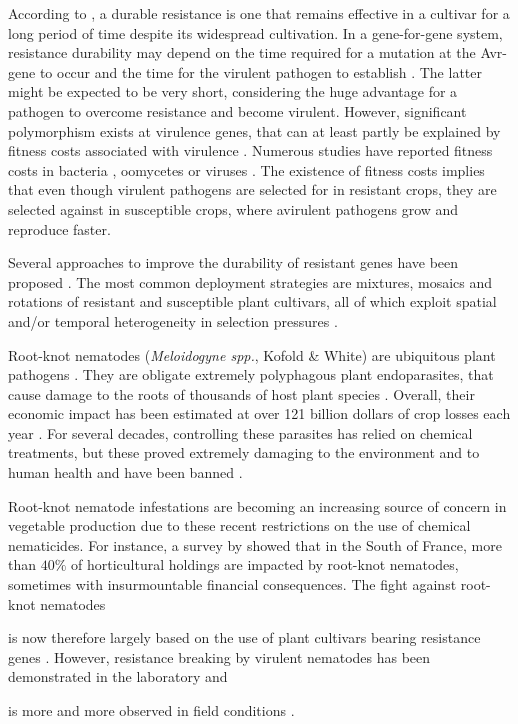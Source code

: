 {According to \citet{Johnson1981}, a durable resistance is one that
remains effective in a cultivar for a long period of time despite its
widespread cultivation. In a gene-for-gene system,
resistance durability may depend on the time required for a mutation
at the Avr-gene to occur and the time for the virulent pathogen to
establish
\citep{vandenBosch2003,Stuthman2007,Barrett2008,Fabre2009,Brown2015,Zhan2015}.
The latter might be expected to be very short, considering the huge
advantage for a pathogen to overcome resistance and become virulent.
However, significant polymorphism exists at virulence genes, that can
at least partly be explained by fitness costs associated with
virulence \citep{Stahl1999,Tian2003,Laine2008}. Numerous studies have
reported fitness costs in bacteria \citep{Cruz2000,Leach2001},
oomycetes \citep{Montarry2010} or viruses \citep{Garcia-Arenal2013}.
The existence of fitness costs implies that even though virulent
pathogens are selected for in resistant crops, they are selected
against in susceptible crops, where avirulent pathogens grow and
reproduce faster.

Several approaches to improve the durability of resistant
  genes have been proposed
  \citep{vandenBosch2003,Fabre2012,Papaix2014,Fabre2015,Lof2017}.  The
  most common deployment strategies are mixtures, mosaics and
  rotations of resistant and susceptible plant cultivars, all of
  which exploit spatial and/or temporal heterogeneity in selection
pressures
\citep{Kiyosawa1982,Mundt2002,Pink2002,Djidjou-Demasse2017,Rimbaud2018}.

Root-knot nematodes (\textit{Meloidogyne spp.}, Kofold \& White) are
ubiquitous plant pathogens \citep{Trudgill2001,Jones2011}. They are
obligate extremely polyphagous plant endoparasites, that cause
damage to the roots of thousands of host plant species
\citep{Perry2009, Wesemael2011}.  Overall, their economic impact has
been estimated at over 121 billion dollars of crop losses each year
\citep{Chitwood2003}.  For several decades, controlling these
parasites has relied on chemical treatments, but these proved
extremely damaging to the environment and to human health and have
been banned \citep{Zasada2010,Abad2010}. {Root-knot nematode
  infestations are becoming an increasing source of concern in
  vegetable production due to these recent restrictions on the use of
  chemical nematicides. For instance, a survey by
  \citet{Djian-Caporalino2012} showed that in the South of France,
  more than $40\%$ of horticultural holdings are impacted by root-knot
  nematodes, sometimes with insurmountable financial consequences.
The fight against root-knot nematodes {is now therefore
  largely based on the use of plant cultivars bearing resistance
genes \citep{Williamson2009}. However, resistance breaking by virulent
nematodes has been demonstrated in the laboratory
\citep{Jarquin-Barberena1991,Djian-Caporalino2011,Meher2009} and
{is more and more observed in field conditions
  \citep{Verdejo-Lucas2009}.

}}}}
